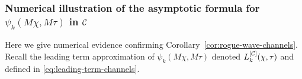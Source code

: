 \subsubsection{Numerical illustration of the asymptotic formula for $\psi_k(M\chi,M\tau)$ in $\mathcal{C}$} 
Here we give numerical evidence confirming Corollary~\ref{cor:rogue-wave-channels}.  Recall the leading term approximation of $\psi_k(M\chi,M\tau)$ denoted $L_k^{[\mathcal{C}]}(\chi,\tau)$ and defined in \eqref{eq:leading-term-channels}.
